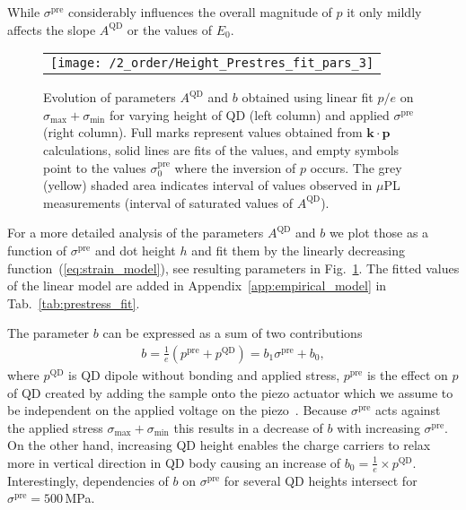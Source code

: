 While $\sigma^{\mathrm{pre}}$ considerably influences the overall magnitude of $p$ it only mildly affects the slope $A^{\mathrm{QD}}$ or the values of $E_0$.
%
%
%

\begin{figure}[!ht]
	\renewcommand{\tabcolsep}{2pt}
	\begin{center}
		\begin{tabular}{c}
			\texttt{[image: /2\_order/Height\_Prestres\_fit\_pars\_3]} \\
		\end{tabular}
	\end{center}
	\caption{Evolution of parameters $A^{\mathrm{QD}}$ and $b$ obtained using linear fit $p/e$ on $\sigma_{\mathrm{max}}+\sigma_{\mathrm{min}}$ for varying height of QD (left column) and applied $\sigma^{\mathrm{pre}}$ (right column). Full marks represent values obtained from $\mathbf{k\cdot p}$ calculations, solid lines are fits of the values, and empty symbols point to the values $\sigma^\mathrm{pre}_\mathrm{0}$ where the inversion of $p$ occurs. The grey (yellow) shaded area indicates interval of values observed in $\mu$PL measurements (interval of saturated values of $A^{\mathrm{QD}}$). 
		\label{fig:FitHeightPrestress}}
\end{figure}
%
For a more detailed analysis of the parameters $A^{\mathrm{QD}}$ and $b$ we plot those as a function of $\sigma^{\mathrm{pre}}$ and dot height $h$ and fit them by the linearly decreasing function~(\ref{eq:strain_model}), see resulting parameters in Fig.~\ref{fig:FitHeightPrestress}. The fitted values of the linear model are added in Appendix~\ref{app:empirical_model} in Tab.~\ref{tab:prestress_fit}.

The parameter $b$ can be expressed as a sum of two contributions
\begin{eqnarray}
b =\frac{1}{e} \left(p^\mathrm{pre} + p^\mathrm{QD}\right)=b_1\sigma^\mathrm{pre} +b_0,
\end{eqnarray} 
%
%
where $p^\mathrm{QD}$ is QD dipole without bonding and applied stress, $p^\mathrm{pre}$ is the effect on $p$ of QD created by adding the sample onto the piezo actuator which we assume to be independent on the applied voltage on the piezo~\cite{Aberl:17}. Because $\sigma^{\mathrm{pre}}$ acts against the applied stress $\sigma_{\mathrm{max}}+\sigma_{\mathrm{min}}$ this results in a decrease of $b$ with increasing $\sigma^\mathrm{pre}$. On the other hand, increasing QD height enables the charge carriers to relax more in vertical direction in QD body causing an increase of $b_0=\frac{1}{e}\times p^\mathrm{QD}$. Interestingly, dependencies of $b$ on $\sigma^\mathrm{pre}$ for several QD heights intersect for $\sigma^\mathrm{pre}=500$$\,$MPa.

